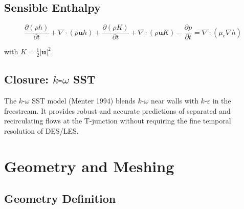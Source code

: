 \documentclass[12pt,a4paper]{report}
\begin{document}
\section{Sensible Enthalpy}

\[
  \frac{\partial (\rho h)}{\partial t}
  + \nabla\!\cdot\!(\rho \mathbf{u} h)
  + \frac{\partial (\rho K)}{\partial t}
  + \nabla\!\cdot\!(\rho \mathbf{u} K)
  - \frac{\partial p}{\partial t}
  = \nabla\!\cdot\!(\mu_e \nabla h)
\]

with $K = \tfrac{1}{2}|\mathbf{u}|^2$.

\section{Closure: $k$-$\omega$ SST}

The $k$-$\omega$ SST model (Menter 1994) blends $k$-$\omega$ near
walls with $k$-$\varepsilon$ in the freestream.  It provides robust
and accurate predictions of separated and recirculating flows at the
T-junction without requiring the fine temporal resolution of DES/LES.


\chapter{Geometry and Meshing}
\label{ch:mesh}

\section{Geometry Definition}
\end{document}
